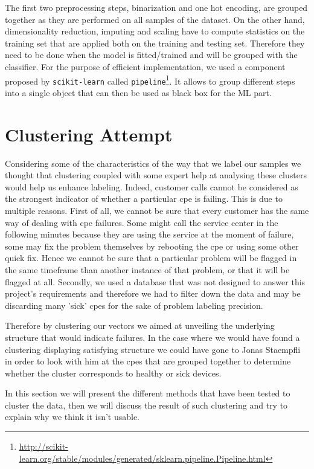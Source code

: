 \vspace{1\baselineskip}
The first two preprocessing steps, binarization and one hot encoding, are grouped together as they are performed on all samples of the dataset. On the other hand, dimensionality reduction, imputing and scaling have to compute statistics on the training set that are applied both on the training and testing set. Therefore they need to be done when the model is fitted/trained and will be grouped with the classifier. For the purpose of efficient implementation, we used a component proposed by \texttt{scikit-learn} called \texttt{pipeline}\footnote{\url{http://scikit-learn.org/stable/modules/generated/sklearn.pipeline.Pipeline.html}}. It allows to group different steps into a single object that can then be used as black box for the ML part. 

\section{Clustering Attempt}
Considering some of the characteristics of the way that we label our samples we thought that clustering coupled with some expert help at analysing these clusters would help us enhance labeling. Indeed, customer calls cannot be considered as the strongest indicator of whether a particular \acrshort{cpe} is failing. This is due to multiple reasons. First of all, we cannot be sure that every customer has the same way of dealing with \acrshort{cpe} failures. Some might call the service center in the following minutes because they are using the service at the moment of failure, some may fix the problem themselves by rebooting the \acrshort{cpe} or using some other quick fix. Hence we cannot be sure that a particular problem will be flagged in the same timeframe than another instance of that problem, or that it will be flagged at all. Secondly, we used a database that was not designed to answer this project's requirements and therefore we had to filter down the data and may be discarding many 'sick' \acrshort{cpe}s for the sake of problem labeling precision. 

Therefore by clustering our vectors we aimed at unveiling the underlying structure that would indicate failures. In the case where we would have found a clustering displaying satisfying structure we could have gone to Jonas Staempfli in order to look with him at the \acrshort{cpe}s that are grouped together to determine whether the cluster corresponds to healthy or sick devices.

In this section we will present the different methods that have been tested to cluster the data, then we will discuss the result of such clustering and try to explain why we think it isn't usable.



